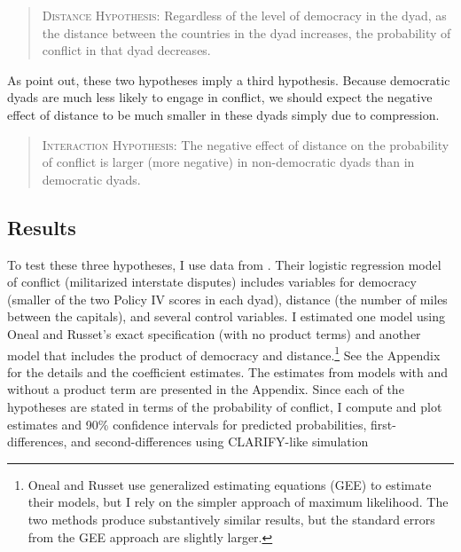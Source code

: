 \documentclass[12pt]{article}
\begin{document}
\begin{quote}
\textsc{Distance Hypothesis}: Regardless of the level of democracy in the dyad, as the distance between the countries in the dyad increases, the probability of conflict in that dyad decreases.
\end{quote}

As \cite{BerryDeMerittEsarey2010} point out, these two hypotheses imply a third hypothesis. Because democratic dyads are much less likely to engage in conflict, we should expect the negative effect of distance to be much smaller in these dyads simply due to compression.

\begin{quote}
\textsc{Interaction Hypothesis}: The negative effect of distance on the probability of conflict is larger (more negative) in non-democratic dyads than in democratic dyads.
\end{quote}

\subsection*{Results}

 To test these three hypotheses, I use data from \cite{OnealRusset2001}. Their logistic regression model of  conflict (militarized interstate disputes) includes variables for democracy (smaller of the two Policy IV scores in each dyad), distance (the number of miles between the capitals), and several control variables. I estimated one model using Oneal and Russet's exact specification (with no product terms) and another model that includes the product of democracy and distance.\footnote{Oneal and Russet use generalized estimating equations (GEE) to estimate their models, but I rely on the simpler approach of maximum likelihood. The two methods produce substantively similar results, but the standard errors from the GEE approach are slightly larger. } See the Appendix for the details and the coefficient estimates. {The estimates from models with and without a product term are presented in the Appendix. } Since each of the hypotheses are stated in terms of the probability of conflict, I compute and plot estimates and 90\% confidence intervals for predicted probabilities, first-differences, and second-differences using CLARIFY-like simulation \citep{KingTomzWhittenburg2000}
\end{document}
